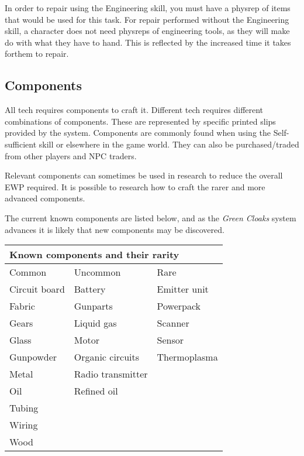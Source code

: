 \documentclass{scrbook}
\begin{document}
In order to repair using the Engineering skill, you must have a physrep of items that would be used for this task. For repair performed without the Engineering skill, a character does not need physreps of engineering tools, as they will make do with what they have to hand. This is reflected by the increased time it takes forthem to repair.

\subsection{Components}

All tech requires components to craft it. Different tech requires different combinations of components. These are represented by specific printed slips provided by the system. Components are commonly found when using the Self-sufficient skill or elsewhere in the game world. They can also be purchased/traded from other players and NPC traders.

Relevant components can sometimes be used in research to reduce the overall EWP required. It is possible to research how to craft the rarer and more advanced components.

The current known components are listed below, and as the \textit{Green Cloaks} system advances it is likely that new components may be discovered.

\begin{table}
\begin{tabular}{|l|l|l|} \hline 
\multicolumn{3}{|l|}{Known components and their rarity} \\
 \hline Common & Uncommon & Rare \\
 \hline Circuit board & Battery & Emitter unit \\
 \hline Fabric & Gunparts & Powerpack \\
 \hline Gears & Liquid gas & Scanner \\
 \hline Glass & Motor & Sensor \\
 \hline Gunpowder & Organic circuits & Thermoplasma \\
 \hline Metal & Radio transmitter &  \\
 \hline Oil & Refined oil &  \\
 \hline Tubing &  &  \\
 \hline Wiring &  &  \\
 \hline Wood &  &  \\
 \hline \end{tabular}

\end{table}
\end{document}
